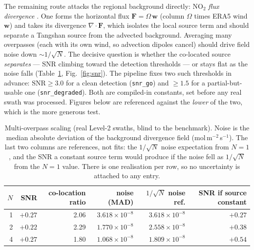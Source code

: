 \documentclass[11pt,a4paper]{article}
\providecommand{\ce}[1]{\ensuremath{\mathrm{#1}}}
\begin{document}
The remaining route attacks the regional background directly: \ce{NO_2} \emph{flux divergence}
\citep{beirle_2021,beirle_2023}. One forms the horizontal flux $\mathbf{F}=\Omega\,\mathbf{w}$
(column $\Omega$ times ERA5 wind $\mathbf{w}$) and takes its divergence
$\nabla\!\cdot\!\mathbf{F}$, which isolates the local source term and should separate a Tangshan
source from the advected background. Averaging many overpasses (each with its own wind, so
advection dipoles cancel) should drive field noise down $\sim\!1/\sqrt{N}$. The decisive question
is whether the co-located source \emph{separates} --- SNR climbing toward the detection
thresholds --- or stays flat as the noise falls (Table~\ref{tab:flux}, Fig.~\ref{fig:snr}). The
pipeline fixes two such thresholds in advance: $\mathrm{SNR}\ge3.0$ for a clean detection
(\texttt{snr\_go}) and $\ge1.5$ for a partial-but-usable one (\texttt{snr\_degraded}). Both are
compiled-in constants, set before any real swath was processed. Figures below are referenced
against the \emph{lower} of the two, which is the more generous test.

\begin{table}[t]
\centering
\caption{Multi-overpass scaling (real Level-2 swaths, blind to the benchmark). Noise is the median
absolute deviation of the background divergence field (mol\,m$^{-2}$\,s$^{-1}$). The last two
columns are references, not fits: the $1/\sqrt{N}$ noise expectation from $N{=}1$, and the SNR a
constant source term would produce if the noise fell as $1/\sqrt{N}$ from the $N{=}1$ value.
There is one realisation per row, so no uncertainty is attached to any entry.}
\label{tab:flux}
\small
\begin{tabular}{@{}rrrrrr@{}}
\toprule
$N$ & SNR & co-location ratio & noise (MAD) & $1/\sqrt{N}$ noise ref. & SNR if source constant \\
\midrule
1 & $+0.27$ & 2.06 & $3.618\times10^{-8}$ & $3.618\times10^{-8}$ & $+0.27$ \\
2 & $+0.22$ & 2.29 & $1.770\times10^{-8}$ & $2.558\times10^{-8}$ & $+0.38$ \\
4 & $+0.27$ & 1.80 & $1.068\times10^{-8}$ & $1.809\times10^{-8}$ & $+0.54$ \\
\bottomrule
\end{tabular}
\end{table}
\end{document}
